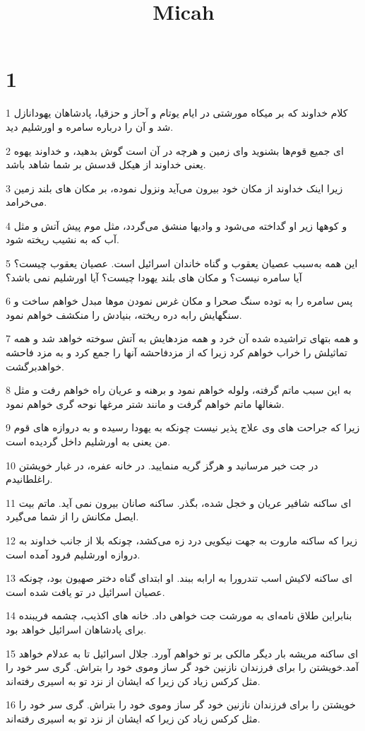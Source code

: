 

\title{Micah}


\chapter{1}

\par 1 کلام خداوند که بر میکاه مورشتی در ایام یوتام و آحاز و حزقیا، پادشاهان یهودانازل شد و آن را درباره سامره و اورشلیم دید.
\par 2 ‌ای جمیع قوم‌ها بشنوید و‌ای زمین و هر‌چه در آن است گوش بدهید، و خداوند یهوه یعنی خداوند از هیکل قدسش بر شما شاهد باشد.
\par 3 زیرا اینک خداوند از مکان خود بیرون می‌آید ونزول نموده، بر مکان های بلند زمین می‌خرامد.
\par 4 و کوهها زیر او گداخته می‌شود و وادیها منشق می‌گردد، مثل موم پیش آتش و مثل آب که به نشیب ریخته شود.
\par 5 این همه به‌سبب عصیان یعقوب و گناه خاندان اسرائیل است. عصیان یعقوب چیست؟ آیا سامره نیست؟ و مکان های بلند یهودا چیست؟ آیا اورشلیم نمی باشد؟
\par 6 پس سامره را به توده سنگ صحرا و مکان غرس نمودن موها مبدل خواهم ساخت و سنگهایش رابه دره ریخته، بنیادش را منکشف خواهم نمود.
\par 7 و همه بتهای تراشیده شده آن خرد و همه مزدهایش به آتش سوخته خواهد شد و همه تماثیلش را خراب خواهم کرد زیرا که از مزدفاحشه آنها را جمع کرد و به مزد فاحشه خواهدبرگشت.
\par 8 به این سبب ماتم گرفته، ولوله خواهم نمود و برهنه و عریان راه خواهم رفت و مثل شغالها ماتم خواهم گرفت و مانند شتر مرغها نوحه گری خواهم نمود.
\par 9 زیرا که جراحت های وی علاج پذیر نیست چونکه به یهودا رسیده و به دروازه های قوم من یعنی به اورشلیم داخل گردیده است.
\par 10 در جت خبر مرسانید و هرگز گریه منمایید. در خانه عفره، در غبار خویشتن راغلطانیدم.
\par 11 ‌ای ساکنه شافیر عریان و خجل شده، بگذر. ساکنه صانان بیرون نمی آید. ماتم بیت ایصل مکانش را از شما می‌گیرد.
\par 12 زیرا که ساکنه ماروت به جهت نیکویی درد زه می‌کشد، چونکه بلا از جانب خداوند به دروازه اورشلیم فرود آمده است.
\par 13 ‌ای ساکنه لاکیش اسب تندرورا به ارابه ببند. او ابتدای گناه دختر صهیون بود، چونکه عصیان اسرائیل در تو یافت شده است.
\par 14 بنابراین طلاق نامه‌ای به مورشت جت خواهی داد. خانه های اکذیب، چشمه فریبنده برای پادشاهان اسرائیل خواهد بود.
\par 15 ‌ای ساکنه مریشه بار دیگر مالکی بر تو خواهم آورد. جلال اسرائیل تا به عدلام خواهد آمد.خویشتن را برای فرزندان نازنین خود گر ساز وموی خود را بتراش. گری سر خود را مثل کرکس زیاد کن زیرا که ایشان از نزد تو به اسیری رفته‌اند.
\par 16 خویشتن را برای فرزندان نازنین خود گر ساز وموی خود را بتراش. گری سر خود را مثل کرکس زیاد کن زیرا که ایشان از نزد تو به اسیری رفته‌اند.

